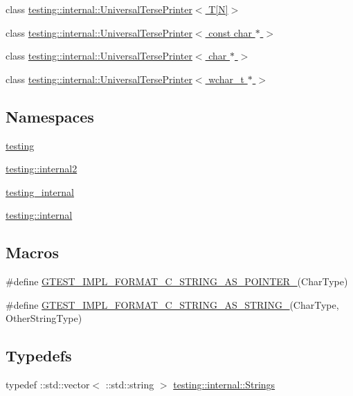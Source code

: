 \begin{DoxyCompactItemize}
class \hyperlink{classtesting_1_1internal_1_1UniversalTersePrinter_3_01T[N]_4}{testing\+::internal\+::\+Universal\+Terse\+Printer$<$ T\mbox{[}\+N\mbox{]}$>$}
\item 
class \hyperlink{classtesting_1_1internal_1_1UniversalTersePrinter_3_01const_01char_01_5_01_4}{testing\+::internal\+::\+Universal\+Terse\+Printer$<$ const char $\ast$ $>$}
\item 
class \hyperlink{classtesting_1_1internal_1_1UniversalTersePrinter_3_01char_01_5_01_4}{testing\+::internal\+::\+Universal\+Terse\+Printer$<$ char $\ast$ $>$}
\item 
class \hyperlink{classtesting_1_1internal_1_1UniversalTersePrinter_3_01wchar__t_01_5_01_4}{testing\+::internal\+::\+Universal\+Terse\+Printer$<$ wchar\+\_\+t $\ast$ $>$}
\end{DoxyCompactItemize}
\subsection*{Namespaces}
\begin{DoxyCompactItemize}
\item 
 \hyperlink{namespacetesting}{testing}
\item 
 \hyperlink{namespacetesting_1_1internal2}{testing\+::internal2}
\item 
 \hyperlink{namespacetesting__internal}{testing\+\_\+internal}
\item 
 \hyperlink{namespacetesting_1_1internal}{testing\+::internal}
\end{DoxyCompactItemize}
\subsection*{Macros}
\begin{DoxyCompactItemize}
\item 
\#define \hyperlink{gtest-printers_8h_a79d4724b4bc2a1dd8493c366b5ca626a}{G\+T\+E\+S\+T\+\_\+\+I\+M\+P\+L\+\_\+\+F\+O\+R\+M\+A\+T\+\_\+\+C\+\_\+\+S\+T\+R\+I\+N\+G\+\_\+\+A\+S\+\_\+\+P\+O\+I\+N\+T\+E\+R\+\_\+}(Char\+Type)
\item 
\#define \hyperlink{gtest-printers_8h_ad6102ed2a0571d5196e606a061c16a10}{G\+T\+E\+S\+T\+\_\+\+I\+M\+P\+L\+\_\+\+F\+O\+R\+M\+A\+T\+\_\+\+C\+\_\+\+S\+T\+R\+I\+N\+G\+\_\+\+A\+S\+\_\+\+S\+T\+R\+I\+N\+G\+\_\+}(Char\+Type,  Other\+String\+Type)
\end{DoxyCompactItemize}
\subsection*{Typedefs}
\begin{DoxyCompactItemize}
\item 
typedef \+::std\+::vector$<$ \+::std\+::string $>$ \hyperlink{namespacetesting_1_1internal_a50003bb76ec2934be1062be11efba8bf}{testing\+::internal\+::\+Strings}
\end{DoxyCompactItemize}
